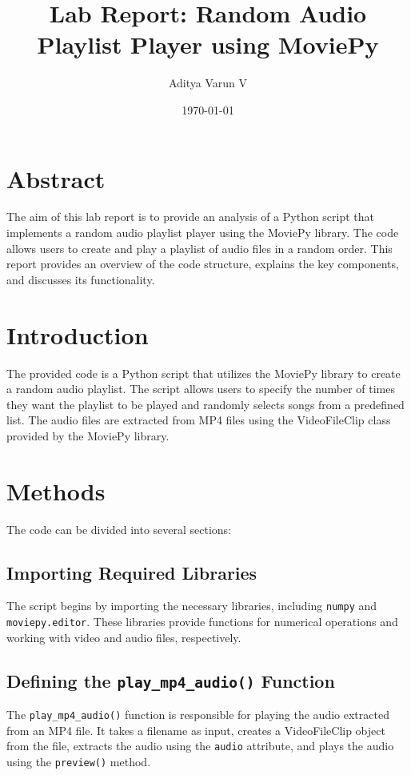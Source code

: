 \documentclass{article}
\title{Lab Report: Random Audio Playlist Player using MoviePy}
\author{Aditya Varun V}
\date{\today}
\begin{document}
\maketitle

\section{Abstract}
The aim of this lab report is to provide an analysis of a Python script that implements a random audio playlist player using the MoviePy library. The code allows users to create and play a playlist of audio files in a random order. This report provides an overview of the code structure, explains the key components, and discusses its functionality.

\section{Introduction}
The provided code is a Python script that utilizes the MoviePy library to create a random audio playlist. The script allows users to specify the number of times they want the playlist to be played and randomly selects songs from a predefined list. The audio files are extracted from MP4 files using the VideoFileClip class provided by the MoviePy library.

\section{Methods}
The code can be divided into several sections:

\subsection{Importing Required Libraries}
The script begins by importing the necessary libraries, including \texttt{numpy} and \texttt{moviepy.editor}. These libraries provide functions for numerical operations and working with video and audio files, respectively.

\subsection{Defining the \texttt{play\_mp4\_audio()} Function}
The \texttt{play\_mp4\_audio()} function is responsible for playing the audio extracted from an MP4 file. It takes a filename as input, creates a VideoFileClip object from the file, extracts the audio using the \texttt{audio} attribute, and plays the audio using the \texttt{preview()} method.
\end{document}

